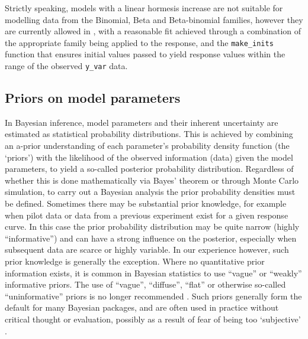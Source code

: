 \documentclass[
]{jss}
\begin{document}
Strictly speaking, models with a linear hormesis increase are not
suitable for modelling data from the Binomial, Beta and Beta-binomial
families, however they are currently allowed in , with a
reasonable fit achieved through a combination of the appropriate family
being applied to the response, and the 
\texttt{make\_inits} function that ensures initial values passed to
 yield response values within the range of the observed
\texttt{y\_var} data.

\hypertarget{priors-on-model-parameters}{%
\subsection{Priors on model
parameters}\label{priors-on-model-parameters}}

In Bayesian inference, model parameters and their inherent uncertainty
are estimated as statistical probability distributions. This is achieved
by combining an a-prior understanding of each parameter's probability
density function (the `priors') with the likelihood of the observed
information (data) given the model parameters, to yield a so-called
posterior probability distribution. Regardless of whether this is done
mathematically via Bayes' theorem or through Monte Carlo simulation, to
carry out a Bayesian analysis the prior probability densities must be
defined. Sometimes there may be substantial prior knowledge, for example
when pilot data or data from a previous experiment exist for a given
response curve. In this case the prior probability distribution may be
quite narrow (highly ``informative'') and can have a strong influence on
the posterior, especially when subsequent data are scarce or highly
variable. In our experience however, such prior knowledge is generally
the exception. Where no quantitative prior information exists, it is
common in Bayesian statistics to use ``vague'' or ``weakly'' informative
priors. The use of ``vague'', ``diffuse'', ``flat'' or otherwise
so-called ``uninformative'' priors is no longer recommended
\citep{Banner2020}. Such priors generally form the default for many
Bayesian packages, and are often used in practice without critical
thought or evaluation, possibly as a result of fear of being too
`subjective' \citep{Banner2020}.
\end{document}
